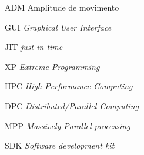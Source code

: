 \begin{siglas}
  \item[ADM] Amplitude de movimento
  \item[GUI] \textit{Graphical User Interface}
  \item[JIT] \textit{just in time}
  \item[XP] \textit{Extreme Programming}
  \item[HPC] \textit{High Performance Computing}
  \item[DPC] \textit{Distributed/Parallel Computing}
  \item[MPP] \textit{Massively Parallel processing}
  \item[SDK] \textit{Software development kit}
\end{siglas}
